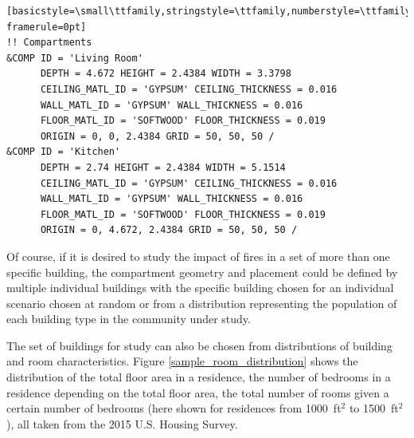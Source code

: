\documentclass[12pt,twoside]{book}
\begin{document}
\begin{lstlisting}[basicstyle=\small\ttfamily,stringstyle=\ttfamily,numberstyle=\ttfamily,language=,frame=single, framerule=0pt]
!! Compartments
&COMP ID = 'Living Room'
      DEPTH = 4.672 HEIGHT = 2.4384 WIDTH = 3.3798
      CEILING_MATL_ID = 'GYPSUM' CEILING_THICKNESS = 0.016
      WALL_MATL_ID = 'GYPSUM' WALL_THICKNESS = 0.016
      FLOOR_MATL_ID = 'SOFTWOOD' FLOOR_THICKNESS = 0.019
      ORIGIN = 0, 0, 2.4384 GRID = 50, 50, 50 /
&COMP ID = 'Kitchen'
      DEPTH = 2.74 HEIGHT = 2.4384 WIDTH = 5.1514
      CEILING_MATL_ID = 'GYPSUM' CEILING_THICKNESS = 0.016
      WALL_MATL_ID = 'GYPSUM' WALL_THICKNESS = 0.016
      FLOOR_MATL_ID = 'SOFTWOOD' FLOOR_THICKNESS = 0.019
      ORIGIN = 0, 4.672, 2.4384 GRID = 50, 50, 50 /
\end{lstlisting}

Of course, if it is desired to study the impact of fires in a set of more than one specific building, the compartment geometry and placement could be defined by multiple individual buildings with the specific building chosen for an individual scenario chosen at random or from a distribution representing the population of each building type in the community under study.

The set of buildings for study can also be chosen from distributions of building and room characteristics. Figure \ref{sample_room_distribution} shows the distribution of the total floor area in a residence, the number of bedrooms in a residence depending on the total floor area, the total number of rooms given a certain number of bedrooms (here shown for residences from 1000~ft$^2$ to 1500~ft$^2$), all taken from the 2015 U.S. Housing Survey.
\end{document}
